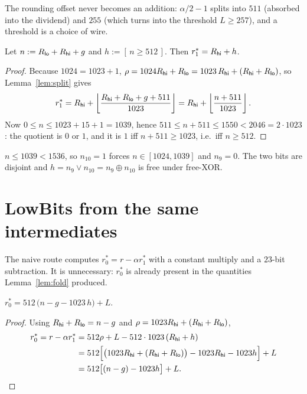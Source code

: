 The rounding offset never becomes an addition: $\alpha/2-1$ splits into $511$
(absorbed into the dividend) and $255$ (which turns into the threshold
$L\ge257$), and a threshold is a choice of wire.

\begin{lemma}\label{lem:fold}
Let $n:=R_{\mathsf{lo}}+R_{\mathsf{hi}}+g$ and $h:=[\,n\ge512\,]$. Then $r_1^{*}=R_{\mathsf{hi}}+h$.
\end{lemma}

\begin{proof}
Because $1024=1023+1$,
$\rho=1024R_{\mathsf{hi}}+R_{\mathsf{lo}}=1023\,R_{\mathsf{hi}}+(R_{\mathsf{hi}}+R_{\mathsf{lo}})$, so Lemma~\ref{lem:split} gives
\[
  r_1^{*}=R_{\mathsf{hi}}+\left\lfloor\frac{R_{\mathsf{hi}}+R_{\mathsf{lo}}+g+511}{1023}\right\rfloor
        =R_{\mathsf{hi}}+\left\lfloor\frac{n+511}{1023}\right\rfloor .
\]
Now $0\le n\le 1023+15+1=1039$, hence $511\le n+511\le 1550<2046=2\cdot1023$:
the quotient is $0$ or $1$, and it is $1$ iff $n+511\ge1023$, i.e.\ iff
$n\ge512$.
\end{proof}

\begin{remark}
$n\le1039<1536$, so $n_{10}=1$ forces $n\in[1024,1039]$ and $n_9=0$. The two
bits are disjoint and $h=n_9\vee n_{10}=n_9\oplus n_{10}$ is free under
free-XOR.
\end{remark}

\section{\textsf{LowBits} from the same intermediates}

The naive route computes $r_0^{*}=r-\alpha r_1^{*}$ with a constant multiply and
a $23$-bit subtraction. It is unnecessary: $r_0^{*}$ is already present in the
quantities Lemma~\ref{lem:fold} produced.

\begin{theorem}\label{thm:low}
$\displaystyle r_0^{*}=512\,\big(n-g-1023\,h\big)+L .$
\end{theorem}

\begin{proof}
Using $R_{\mathsf{hi}}+R_{\mathsf{lo}}=n-g$ and $\rho=1023R_{\mathsf{hi}}+(R_{\mathsf{hi}}+R_{\mathsf{lo}})$,
\[
\begin{aligned}
  r_0^{*}=r-\alpha r_1^{*}
  &=512\rho+L-512\cdot1023\,(R_{\mathsf{hi}}+h)\\
  &=512\Big[\big(1023R_{\mathsf{hi}}+(R_{\mathsf{hi}}+R_{\mathsf{lo}})\big)-1023R_{\mathsf{hi}}-1023h\Big]+L\\
  &=512\big[(n-g)-1023h\big]+L. \qedhere
\end{aligned}
\]
\end{proof}

